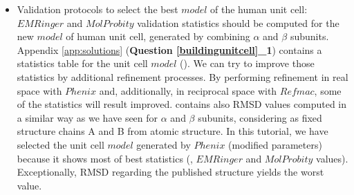 \begin{itemize}
 \item Validation protocols to select the best $model$ of the human  unit cell:\\
 
 $EMRinger$ and $MolProbity$ validation statistics should be computed for the new $model$ of human  unit cell, generated by combining  $\alpha$ and $\beta$ subunits. Appendix \ref{app:solutions} (\textbf{Question \ref{buildingunitcell}\_1}) contains a statistics table for the unit cell $model$ (). We can try to improve those statistics by additional refinement processes. By performing refinement in real space with $Phenix$ and, additionally, in reciprocal space with $Refmac$, some of the statistics will result improved.  contains also RMSD values computed in a similar way as we have seen for $\alpha$ and $\beta$ subunits, considering as fixed structure chains A and B from  atomic structure. In this tutorial, we have selected the unit cell $model$ generated by $Phenix$  (modified parameters) because it shows most of best statistics (\ccmask, $EMRinger$  and $MolProbity$ values). Exceptionally, RMSD regarding the published structure yields the worst value.
 
\end{itemize}

